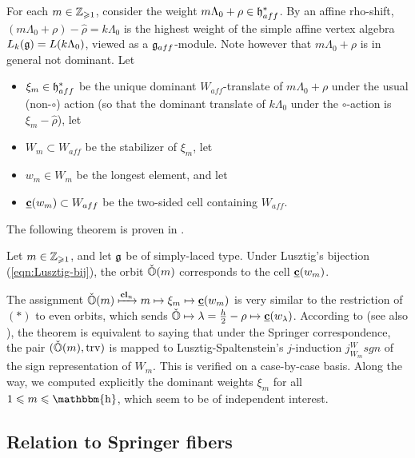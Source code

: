 \documentclass[reqno]{amsart}
\DeclareMathOperator{\Bh}{\mathbbm{h}}
\newcommand{\ubar}[1]{\underline{#1}}
\DeclareMathOperator{\cl}{\mathbf{cl}}
\DeclareMathOperator{\trv}{trv}
\begin{document}
For each $m \in \mathbb{Z}_{\geqslant 1}$, consider the weight $m \Lambda_0 + \rho \in \mathfrak{h}_{aff}^*$. By an affine rho-shift, $(m \Lambda_0 + \rho) - \hat \rho = k \Lambda_0$ is the highest weight of the simple affine vertex algebra $L_k(\mathfrak{g}) = L(k \Lambda_0)$, viewed as a $\mathfrak{g}_{aff}$-module. Note however that $m \Lambda_0 + \rho$ is in general not dominant. Let
\begin{itemize}
	\item $\xi_m \in \mathfrak{h}_{aff}^*$ be the unique dominant $W_{aff}$-translate of $m \Lambda_0 + \rho$ under the usual (non-$\circ$) action (so that the dominant translate of $k \Lambda_0$ under the $\circ$-action is $\xi_m - \hat \rho$), let 
	
	\item $W_m \subset W_{aff}$ be the stabilizer of $\xi_m$, let
	\item $w_m \in W_m$ be the longest element, and let
	
	\item $\ubar \bc(w_m) \subset W_{aff}$ be the two-sided cell containing $W_{aff}$.
\end{itemize}
The following theorem is proven in \cite[Theorem 4.2.1]{SYZ:cl}.

\begin{theorem}\label{thm:Om-wm}
	Let $m \in \mathbb{Z}_{\geqslant 1}$, and let $\mathfrak{g}$ be of simply-laced type. Under Lusztig's bijection (\ref{eqn:Lusztig-bij}), the orbit $\check {\mathbb{O}}(m)$ corresponds to the cell $\ubar \bc(w_m)$.
\end{theorem}

The assignment $\check \BO(m) \xmapsto{\cl_n} m \mapsto \xi_m \mapsto \ubar \bc(w_m)$ is very similar to the restriction of $(\ast)$ to even orbits, which sends $\check \BO \mapsto \lambda =\frac h2 - \rho \mapsto \ubar \bc(w_\lambda)$. According to \cite[Proposition 4.8]{Yun:Epi} (see also \cite[Lemma 4.2.3]{SYZ:cl}), the theorem is equivalent to saying that under the Springer correspondence, the pair $(\check \BO(m),\trv)$ is mapped to Lusztig-Spaltenstein's $j$-induction $j_{W_m}^W sgn$ of the sign representation of $W_m$. This is verified on a case-by-case basis. Along the way, we computed explicitly the dominant weights $\xi_m$ for all $1 \le m \le \Bh$, which seem to be of independent interest.

\subsection{Relation to Springer fibers}
\end{document}
